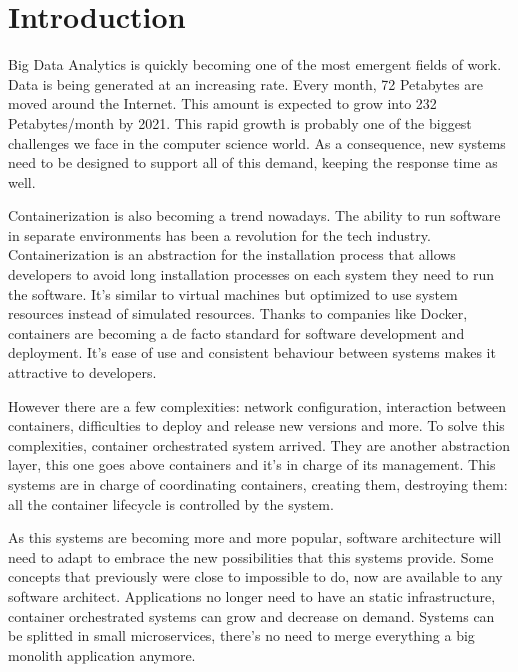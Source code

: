 
\chapter{Introduction} %

\label{Chapter1} %



Big Data Analytics is quickly becoming one of the most emergent fields of work. Data is being generated at an increasing rate. Every month, 72 Petabytes are moved around the Internet\parencite{ciscoreport}. This amount is expected to grow into 232 Petabytes/month by 2021\parencite{ciscoreport}. This rapid growth is probably one of the biggest challenges we face in the computer science world. As a consequence, new systems need to be designed to support all of this demand, keeping the response time as well. 

Containerization is also becoming a trend nowadays. The ability to run software in separate environments has been a revolution for the tech industry. Containerization is an abstraction for the installation process that allows developers to avoid long installation processes on each system they need to run the software. It’s similar to virtual machines but optimized to use system resources instead of simulated resources. Thanks to companies like Docker, containers are becoming a de facto standard for software development and deployment. It’s ease of use and consistent behaviour between systems makes it attractive to developers.

However there are a few complexities: network configuration, interaction between containers, difficulties to deploy and release new versions and more. To solve this complexities, container orchestrated system arrived. They are another abstraction layer, this one goes above containers and it's in charge of its management. This systems are in charge of coordinating containers, creating them, destroying them: all the container lifecycle is controlled by the system.

As this systems are becoming more and more popular, software architecture will need to adapt to embrace the new possibilities that this systems provide. Some concepts that previously were close to impossible to do, now are available to any software architect. Applications no longer need to have an static infrastructure, container orchestrated systems can grow and decrease on demand. Systems can be splitted in small microservices, there’s no need to merge everything a big monolith application anymore.


